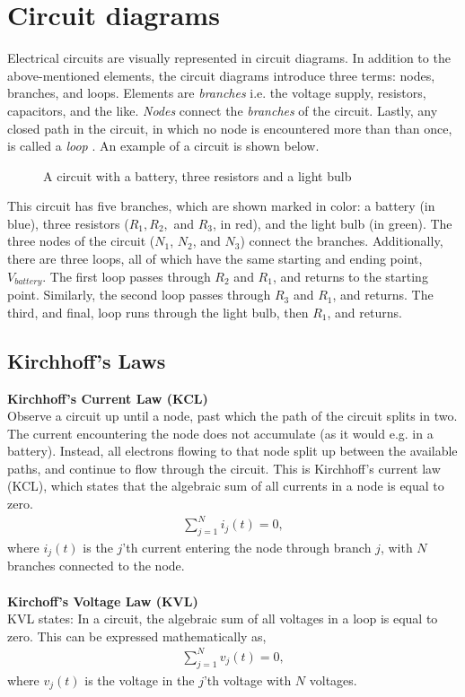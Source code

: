 \section{Circuit diagrams}
Electrical circuits are visually represented in circuit diagrams. In addition to the above-mentioned elements, the circuit diagrams introduce three terms: nodes, branches, and loops. Elements are \textit{branches} i.e.  the voltage supply, resistors, capacitors, and the like. \textit{Nodes} connect the \textit{branches} of the circuit. Lastly, any closed path in the circuit, in which no node is encountered more than than once, is called a \textit{loop} \cite[page~32]{bcircuit}. An example of a circuit is shown below.

\begin{figure}[H]
 
 \caption{A circuit with a battery, three resistors and a light bulb}
\end{figure}

This circuit has five branches, which are shown marked in color: a battery (in blue), three resistors ($R_1, R_2,$ and $R_3$, in red), and the light bulb (in green). The three nodes of the circuit ($N_1$, $N_2$, and $N_3$) connect the branches. Additionally, there are three loops, all of which have the same starting and ending point, $V_{battery}$. The first loop passes through $R_2$ and $R_1$, and returns to the starting point. Similarly, the second loop passes through $R_3$ and $R_1$, and returns. The third, and final, loop runs through the light bulb, then $R_1$, and returns. 

\subsection{Kirchhoff's Laws}
\textbf{Kirchhoff's Current Law (KCL)}
\\
Observe a circuit up until a node, past which the path of the circuit splits in two. The current encountering the node does not accumulate (as it would e.g. in a battery). Instead, all electrons flowing to that node split up between the available paths, and continue to flow through the circuit. This is Kirchhoff’s current law (KCL), which states that the algebraic sum of all currents in a node is equal to zero. 
\begin{align}
\sum_{j=1}^{N} i_{j}(t) = 0,
\end{align}
where $i_{j}(t)$ is the $j$'th current entering the node through branch $j$, with $N$ branches connected to the node. \cite[page~32]{bcircuit}
\\
\\
\textbf{Kirchoff's Voltage Law (KVL)}
\\
KVL states: In a circuit, the algebraic sum of all voltages in a loop is equal to zero. This can be expressed mathematically  as,
\begin{align}
\sum_{j=1}^{N} v_{j}(t) = 0,
\end{align}
where $v_{j}(t)$ is the voltage in the $j$'th voltage with $N$ voltages.\citep[page~34]{bcircuit}\\

